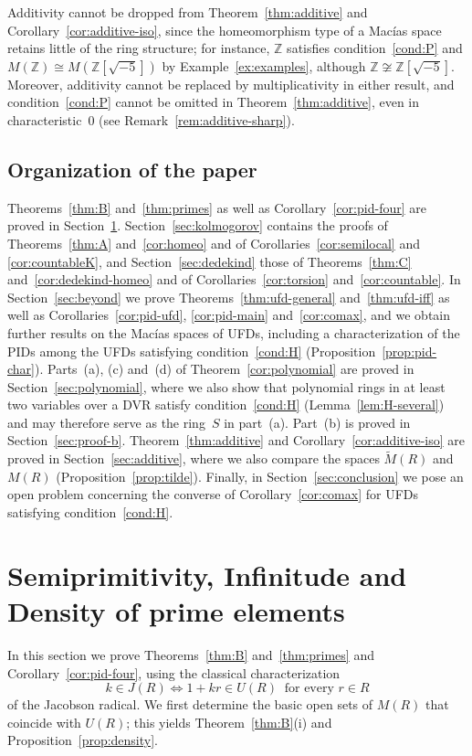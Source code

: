 \documentclass[12pt,reqno,a4paper]{amsart}
\newcommand{\Z}{\mathbb{Z}}
\theoremstyle{plain}
\theoremstyle{definition}
\begin{document}
Additivity cannot be dropped from Theorem~\ref{thm:additive} and Corollary~\ref{cor:additive-iso}, since the homeomorphism type of a Mac\'ias space retains little of the ring structure; for instance, $\Z$ satisfies condition~\ref{cond:P} and $M(\Z)\cong M(\Z[\sqrt{-5}])$ by Example~\ref{ex:examples}, although $\Z\not\cong\Z[\sqrt{-5}]$. Moreover, additivity cannot be replaced by multiplicativity in either result, and condition~\ref{cond:P} cannot be omitted in Theorem~\ref{thm:additive}, even in characteristic~$0$ (see Remark~\ref{rem:additive-sharp}).

\subsection*{Organization of the paper}
Theorems~\ref{thm:B} and~\ref{thm:primes} as well as Corollary~\ref{cor:pid-four} are proved in Section~\ref{sec:density}. Section~\ref{sec:kolmogorov} contains the proofs of Theorems~\ref{thm:A} and~\ref{cor:homeo} and of Corollaries~\ref{cor:semilocal} and \ref{cor:countableK}, and Section~\ref{sec:dedekind} those of Theorems~\ref{thm:C} and~\ref{cor:dedekind-homeo} and of Corollaries~\ref{cor:torsion} and~\ref{cor:countable}. In Section~\ref{sec:beyond} we prove Theorems~\ref{thm:ufd-general} and~\ref{thm:ufd-iff} as well as Corollaries~\ref{cor:pid-ufd}, \ref{cor:pid-main} and~\ref{cor:comax}, and we obtain further results on the Mac\'ias spaces of UFDs, including a characterization of the PIDs among the UFDs satisfying condition~\ref{cond:H} (Proposition~\ref{prop:pid-char}). Parts~(a), (c) and~(d) of Theorem~\ref{cor:polynomial} are proved in Section~\ref{sec:polynomial}, where we also show that polynomial rings in at least two variables over a DVR satisfy condition~\ref{cond:H} (Lemma~\ref{lem:H-several}) and may therefore serve as the ring~$S$ in part~(a). Part~(b) is proved in Section~\ref{sec:proof-b}. Theorem~\ref{thm:additive} and Corollary~\ref{cor:additive-iso} are proved in Section~\ref{sec:additive}, where we also compare the spaces $\widetilde{M}(R)$ and $M(R)$ (Proposition~\ref{prop:tilde}). Finally, in Section~\ref{sec:conclusion} we pose an open problem concerning the converse of Corollary~\ref{cor:comax} for UFDs satisfying condition~\ref{cond:H}.
\section{Semiprimitivity, Infinitude and Density of prime elements}\label{sec:density}
In this section we prove Theorems~\ref{thm:B} and~\ref{thm:primes} and Corollary~\ref{cor:pid-four}, using the classical characterization \cite[Proposition~1.9]{AtiyahMacdonald}
\begin{equation}\label{eq:jacobson}
k\in J(R)\iff 1+kr\in U(R)\ \text{ for every } r\in R
\end{equation}
of the Jacobson radical. We first determine the basic open sets of $M(R)$ that coincide with $U(R)$; this yields Theorem~\ref{thm:B}(i) and Proposition~\ref{prop:density}.
\end{document}
